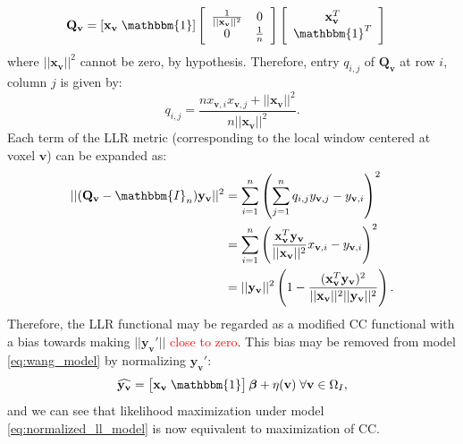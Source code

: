 \begin{align*}
    \mathbf{Q}_{\mathbf{v}} &= [\mathbf{x}_{\mathbf{v}} \; \mathbbm{1}]
    \left[\begin{array}{cc}
        \frac{1}{||\mathbf{x}_{\mathbf{v}}||^{2}} & 0\\
        0 & \frac{1}{n}
    \end{array}\right]
    \left[\begin{array}{c}
        \mathbf{x}_{\mathbf{v}}^{T}\\
        \mathbbm{1}^{T}
    \end{array}\right]
\end{align*}
where $||\mathbf{x}_{\mathbf{v}}||^{2}$ cannot be zero, by hypothesis. Therefore, entry $q_{i,j}$ of $\mathbf{Q}_{\mathbf{v}}$ at row $i$, column $j$ is given by:
\vspace{-0.3cm}
\begin{displaymath}
    q_{i,j} = \frac{nx_{\mathbf{v},i}x_{\mathbf{v}, j} + ||\mathbf{x}_{\mathbf{v}}||^{2}}{n||\mathbf{x}_{\mathbf{v}}||^{2}}.
\end{displaymath}
Each term of the LLR metric (corresponding to the local window centered at voxel $\mathbf{v}$) can be expanded as:
\begin{equation}\label{eq:llr_cc_relationship}
    \begin{split}
        ||(\mathbf{Q}_{\mathbf{v}} - \mathbbm{I}_{n})\mathbf{y}_{\mathbf{v}}||^{2} &= \sum_{i=1}^{n} \left(\sum_{j=1}^{n} q_{i,j} y_{\mathbf{v}, j} - y_{\mathbf{v},i}\right)^{2}\\
        &=\sum_{i=1}^{n}\left(\frac{\mathbf{x}_{\mathbf{v}}^{T}\mathbf{y}_{\mathbf{v}}}{||\mathbf{x}_{\mathbf{v}}||^{2}} x_{\mathbf{v}, i} - y_{\mathbf{v},i}\right)^{2} \\
        &= ||\mathbf{y}_{\mathbf{v}}||^{2}\left(1 - \frac{(\mathbf{x}_{\mathbf{v}}^{T}\mathbf{y}_{\mathbf{v}})^{2}}{||\mathbf{x}_{\mathbf{v}}||^{2}||\mathbf{y}_{\mathbf{v}}||^{2}}\right).
    \end{split}
\end{equation}
Therefore, the LLR functional may be regarded as a modified CC functional with a bias towards making $||\mathbf{y}_{\mathbf{v}}'||$ \textcolor{red}{close to zero}. This bias may be removed from model \eqref{eq:wang_model} by normalizing $\mathbf{y}_{\mathbf{v}}'$:\\
\begin{equation}\label{eq:normalized_ll_model}
    \widehat{\mathbf{y}_{\mathbf{v}}} = \left[\mathbf{x}_{\mathbf{v}} \; \mathbbm{1}\right]\boldsymbol{\beta} + \eta(\mathbf{v}) \; \forall \mathbf{v}\in\Omega_{I},
\end{equation}
and we can see that likelihood maximization under model \eqref{eq:normalized_ll_model} is now equivalent to maximization of CC.\\

